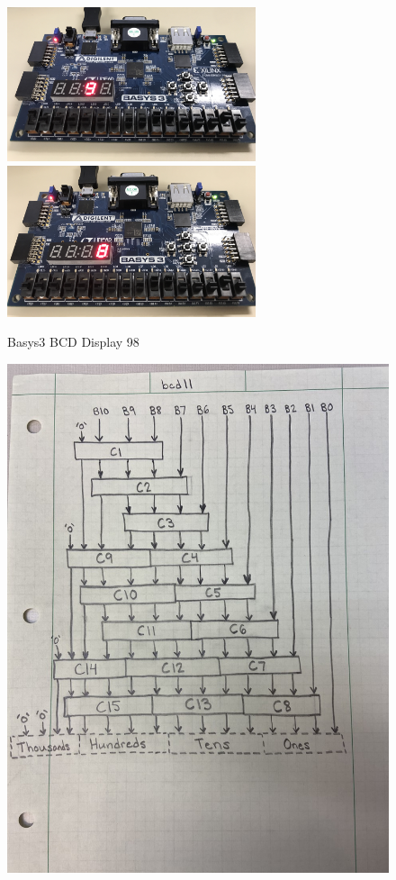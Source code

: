 \documentclass[11pt]{article}
\begin{document}
\begin{figure}[ht]\centering
	\includegraphics[width=0.65\textwidth]{IMG_1618.jpg}
	\includegraphics[width=0.65\textwidth]{IMG_1617.jpg}
	\caption{Basys3 BCD Display 98}
	\label{fig:sim_with_table}
	
\end{figure}
\clearpage

\begin{figure}[ht]\centering
	\includegraphics[width=1\textwidth]{bcd11circuit.jpg}
	\caption{}
	\label{fig:sim_with_table}
	
\end{figure}
\clearpage
\end{document}
